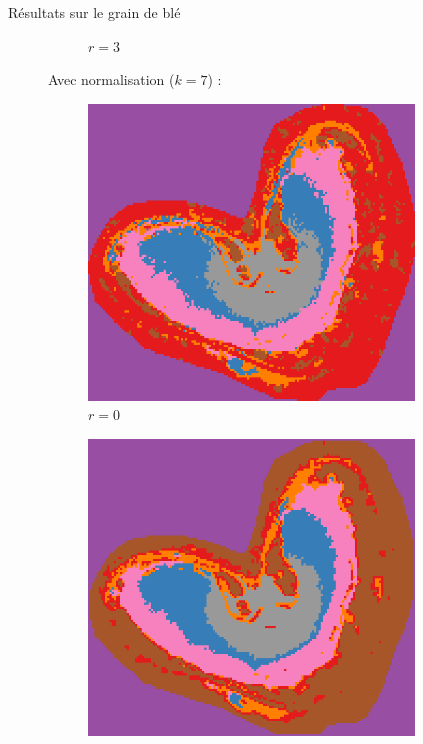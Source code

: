 \documentclass[10pt]{beamer}
\begin{document}
\begin{frame}{Résultats sur le grain de blé}
\begin{figure}[ht]
\begin{subfigure}[t]{0.25\textwidth}
      \caption{$r=3$}
      \label{subfig:peaksel_prominence75_r3_full_colors}
    \end{subfigure}%
    \begin{flushleft}
      \vspace{-0.2cm}
          Avec normalisation ($k=7$) :
    \end{flushleft}%
     \begin{subfigure}[t]{0.25\textwidth}
      \centering
      \includegraphics[width=0.95\textwidth]{fig/peaksel_prominence75_r0_full_norm_colors}
      \caption{$r=0$}
      \label{subfig:peaksel_prominence75_r0_full_norm_colors}
    \end{subfigure}%
    \begin{subfigure}[t]{0.25\textwidth}
      \centering
      \includegraphics[width=0.95\textwidth]{fig/peaksel_prominence75_r1_full_norm_colors}

\end{subfigure}
\end{figure}
\end{frame}
\end{document}
